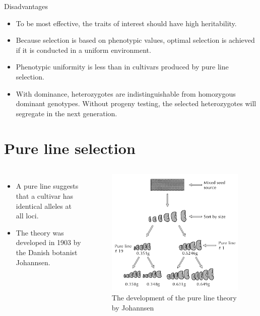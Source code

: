 \documentclass[11pt,ignorenonframetext,aspectratio=169]{beamer}
\providecommand{\tightlist}{%
  \setlength{\itemsep}{0pt}\setlength{\parskip}{0pt}}
\newcommand{\bcolumns}{\begin{columns}[T, onlytextwidth]}
\newcommand{\ecolumns}{\end{columns}}
\begin{document}
\begin{frame}{Disadvantages}
\protect\hypertarget{disadvantages}{}
\begin{itemize}
\tightlist
\item
  To be most effective, the traits of interest should have high
  heritability.
\item
  Because selection is based on phenotypic values, optimal selection is
  achieved if it is conducted in a uniform environment.
\item
  Phenotypic uniformity is less than in cultivars produced by pure line
  selection.
\item
  With dominance, heterozygotes are indistinguishable from homozygous
  dominant genotypes. Without progeny testing, the selected
  heterozygotes will segregate in the next generation.
\end{itemize}
\end{frame}

\hypertarget{pure-line-selection}{%
\section{Pure line selection}\label{pure-line-selection}}

\begin{frame}{}
\protect\hypertarget{section-8}{}
\bcolumns
{}

\begin{itemize}
\tightlist
\item
  A pure line suggests that a cultivar has
  \alert{identical alleles at all loci}.
\item
  The theory was developed in 1903 by the Danish botanist Johannsen.
\end{itemize}

\begin{figure}

{\centering \includegraphics[width=0.75\linewidth]{./images/johannsen_bean} 

}

\caption{The development of the pure line theory by Johannsen}\label{fig:johannsen-bean}
\end{figure}

\ecolumns
\end{frame}
\end{document}
